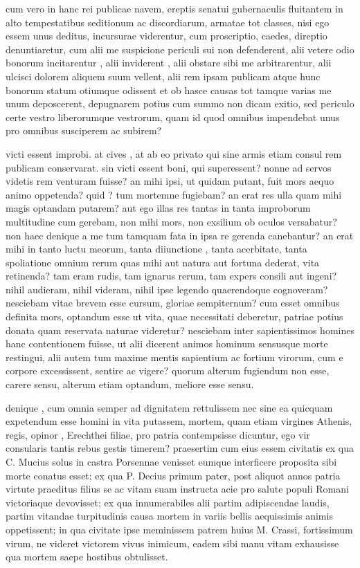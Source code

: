  cum vero in hanc rei publicae navem, ereptis senatui gubernaculis fluitantem in alto tempestatibus seditionum ac discordiarum, armatae tot classes, nisi ego essem unus deditus, incursurae viderentur, cum proscriptio, caedes, direptio denuntiaretur, cum alii me suspicione periculi sui non defenderent, alii vetere odio bonorum incitarentur , alii inviderent , alii obstare sibi me arbitrarentur, alii ulcisci dolorem aliquem suum vellent, alii rem ipsam publicam atque hunc bonorum statum otiumque odissent et ob hasce causas tot tamque varias me unum deposcerent, depugnarem potius cum summo non dicam exitio, sed periculo certe vestro liberorumque vestrorum, quam id quod omnibus impendebat unus pro omnibus susciperem ac subirem?

 victi essent improbi. at cives , at ab eo privato qui sine armis etiam consul rem publicam conservarat. sin victi essent boni, qui superessent? nonne ad servos videtis rem venturam fuisse? an mihi ipsi, ut quidam putant, fuit mors aequo animo oppetenda? quid ? tum mortemne fugiebam? an erat res ulla quam mihi magis optandam putarem? aut ego illas res tantas in tanta improborum multitudine cum gerebam, non mihi mors, non exsilium ob oculos versabatur? non haec denique a me tum tamquam fata in ipsa re gerenda canebantur? an erat mihi in tanto luctu meorum, tanta diiunctione , tanta acerbitate, tanta spoliatione omnium rerum quas mihi aut natura aut fortuna dederat, vita retinenda? tam eram rudis, tam ignarus rerum, tam expers consili aut ingeni? nihil audieram, nihil videram, nihil ipse legendo quaerendoque cognoveram? nesciebam vitae brevem esse cursum, gloriae sempiternum? cum esset omnibus definita mors, optandum esse ut vita, quae necessitati deberetur, patriae potius donata quam reservata naturae videretur? nesciebam inter sapientissimos homines hanc contentionem fuisse, ut alii dicerent animos hominum sensusque morte restingui, alii autem tum maxime mentis sapientium ac fortium virorum, cum e corpore excessissent, sentire ac vigere? quorum alterum fugiendum non esse, carere sensu, alterum etiam optandum, meliore esse sensu.

 denique , cum omnia semper ad dignitatem rettulissem nec sine ea quicquam expetendum esse homini in vita putassem, mortem, quam etiam virgines Athenis, regis, opinor , Erechthei filiae, pro patria contempsisse dicuntur, ego vir consularis tantis rebus gestis timerem? praesertim cum eius essem civitatis ex qua C. Mucius solus in castra Porsennae venisset eumque interficere proposita sibi morte conatus esset; ex qua P. Decius primum pater, post aliquot annos patria virtute praeditus filius se ac vitam suam instructa acie pro salute populi Romani victoriaque devovisset; ex qua innumerabiles alii partim adipiscendae laudis, partim vitandae turpitudinis causa mortem in variis bellis aequissimis animis oppetissent; in qua civitate ipse meminissem patrem huius M. Crassi, fortissimum virum, ne videret victorem vivus inimicum, eadem sibi manu vitam exhausisse qua mortem saepe hostibus obtulisset.

